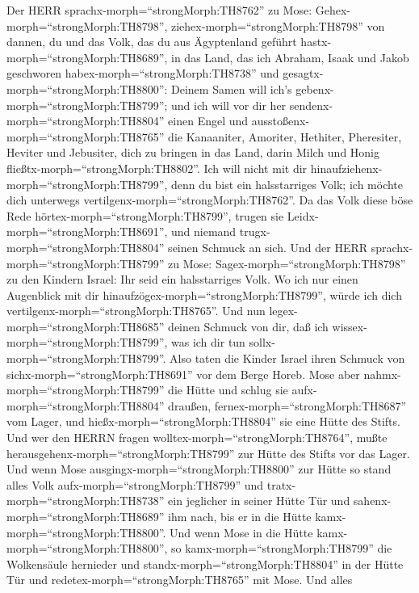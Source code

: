  Der HERR sprachx-morph=``strongMorph:TH8762'' zu Mose:
Gehex-morph=``strongMorph:TH8798'', ziehex-morph=``strongMorph:TH8798''
von dannen, du und das Volk, das du aus Ägyptenland geführt
hastx-morph=``strongMorph:TH8689'', in das Land, das ich Abraham, Isaak
und Jakob geschworen habex-morph=``strongMorph:TH8738'' und
gesagtx-morph=``strongMorph:TH8800'': Deinem Samen will ich's
gebenx-morph=``strongMorph:TH8799'';  und ich will vor dir
her sendenx-morph=``strongMorph:TH8804'' einen Engel und
ausstoßenx-morph=``strongMorph:TH8765'' die Kanaaniter, Amoriter,
Hethiter, Pheresiter, Heviter und Jebusiter,  dich zu
bringen in das Land, darin Milch und Honig
fließtx-morph=``strongMorph:TH8802''. Ich will nicht mit dir
hinaufziehenx-morph=``strongMorph:TH8799'', denn du bist ein
halsstarriges Volk; ich möchte dich unterwegs
vertilgenx-morph=``strongMorph:TH8762''.  Da das Volk diese
böse Rede hörtex-morph=``strongMorph:TH8799'', trugen sie
Leidx-morph=``strongMorph:TH8691'', und niemand
trugx-morph=``strongMorph:TH8804'' seinen Schmuck an sich. 
Und der HERR sprachx-morph=``strongMorph:TH8799'' zu Mose:
Sagex-morph=``strongMorph:TH8798'' zu den Kindern Israel: Ihr seid ein
halsstarriges Volk. Wo ich nur einen Augenblick mit dir
hinaufzögex-morph=``strongMorph:TH8799'', würde ich dich
vertilgenx-morph=``strongMorph:TH8765''. Und nun
legex-morph=``strongMorph:TH8685'' deinen Schmuck von dir, daß ich
wissex-morph=``strongMorph:TH8799'', was ich dir tun
sollx-morph=``strongMorph:TH8799''.  Also taten die Kinder
Israel ihren Schmuck von sichx-morph=``strongMorph:TH8691'' vor dem
Berge Horeb.  Mose aber nahmx-morph=``strongMorph:TH8799''
die Hütte und schlug sie aufx-morph=``strongMorph:TH8804'' draußen,
fernex-morph=``strongMorph:TH8687'' vom Lager, und
hießx-morph=``strongMorph:TH8804'' sie eine Hütte des Stifts. Und wer
den HERRN fragen wolltex-morph=``strongMorph:TH8764'', mußte
herausgehenx-morph=``strongMorph:TH8799'' zur Hütte des Stifts vor das
Lager.  Und wenn Mose ausgingx-morph=``strongMorph:TH8800''
zur Hütte so stand alles Volk aufx-morph=``strongMorph:TH8799'' und
tratx-morph=``strongMorph:TH8738'' ein jeglicher in seiner Hütte Tür und
sahenx-morph=``strongMorph:TH8689'' ihm nach, bis er in die Hütte
kamx-morph=``strongMorph:TH8800''.  Und wenn Mose in die
Hütte kamx-morph=``strongMorph:TH8800'', so
kamx-morph=``strongMorph:TH8799'' die Wolkensäule hernieder und
standx-morph=``strongMorph:TH8804'' in der Hütte Tür und
redetex-morph=``strongMorph:TH8765'' mit Mose.  Und alles
